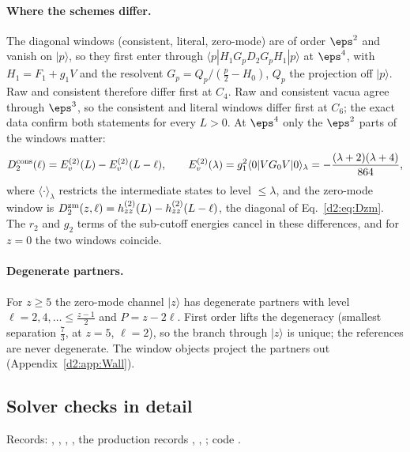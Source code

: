 \paragraph{Where the schemes differ.} The diagonal windows (consistent, literal, zero-mode) are of order $\eps^2$ and
vanish on $|p\rangle$, so they first enter through $\langle p|H_1G_pD_2G_pH_1|p\rangle$ at $\eps^4$, with $H_1=F_1+g_1V$ and the resolvent
$G_p=Q_p/(\frac p2-H_0)$, $Q_p$ the projection off $|p\rangle$. Raw and consistent therefore differ first at $C_4$. Raw
and consistent vacua agree through $\eps^3$, so the consistent and literal windows differ first at $C_6$; the exact data
confirm both statements for every $L>0$. At $\eps^4$ only the $\eps^2$ parts of the windows matter:
\begin{equation}
 D^{\rm cons}_2(\ell)=E_v^{(2)}(L)-E_v^{(2)}(L-\ell),\qquad
 E_v^{(2)}(\lambda)=g_1^2\langle0|VG_0V|0\rangle_\lambda=-\frac{(\lambda+2)(\lambda+4)}{864},
 \label{d2:eq:Ev2}
\end{equation}
where $\langle\cdot\rangle_\lambda$ restricts the intermediate states to level $\le\lambda$, and the zero-mode window is
$D_2^{\rm zm}(z,\ell)=h^{(2)}_{zz}(L)-h^{(2)}_{zz}(L-\ell)$, the diagonal of Eq.~\eqref{d2:eq:Dzm}. The $r_2$ and $g_2$ terms of
the sub-cutoff energies cancel in these differences, and for $z=0$ the two windows coincide.

\paragraph{Degenerate partners.} For $z\ge5$ the zero-mode channel $|z\rangle$ has degenerate partners with level
$\ell=2,4,\dots\le\frac{z-1}2$ and $P=z-2\ell$. First order lifts the degeneracy (smallest separation $\frac73$, at $z=5$,
$\ell=2$), so the branch through $|z\rangle$ is unique; the references are never degenerate. The window objects project
the partners out (Appendix~\ref{d2:app:Wall}).

\subsection{Solver checks in detail}\label{d2:app:checks}
{\small\raggedright\noindent Records: , , ,
, the production records , , ; code
.\par}

